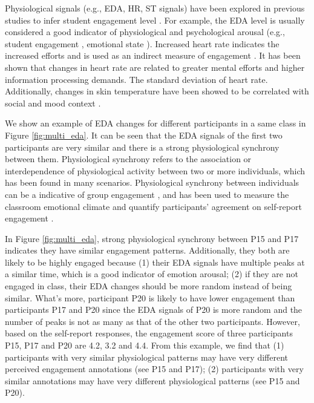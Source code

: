 \documentclass[sigconf]{acmart}
\begin{document}
Physiological signals (e.g., EDA, HR, ST signals) have been explored in previous studies to infer student engagement level \cite{gao2020n,di2018engagement}. For example, the EDA level is usually considered  a good indicator of physiological and psychological arousal (e.g., student engagement \cite{gao2020n}, emotional state \cite{di2018engagement}). Increased heart rate indicates the increased efforts and is used as an indirect measure of engagement \cite{richardson2020engagement}. It has been shown that changes in heart rate are related to greater mental efforts and higher information processing demands. The standard deviation of heart rate. Additionally, changes in skin temperature have been showed to be correlated with social and mood context \cite{ioannou2014thermal}. 

We show an example of EDA changes for different participants in a same class in Figure \ref{fig:multi_eda}. It can be seen that the EDA signals of the first two participants are very similar and there is a strong physiological synchrony  \cite{palumbo2017interpersonal} between them. Physiological synchrony refers to the association or interdependence of physiological activity between two or more individuals, which has been found in many scenarios. Physiological synchrony between individuals can be a indicative of group engagement \cite{palumbo2017interpersonal}, and has been used to measure the classroom emotional climate \cite{gashi2018using} and quantify participants' agreement on self-report engagement \cite{gashi2019using}. 

In  Figure \ref{fig:multi_eda}, strong physiological synchrony between P15 and P17 indicates they have similar engagement patterns. Additionally, they both are likely to be highly engaged because (1) their EDA signals have multiple peaks at a similar time, which is a good indicator of emotion arousal; (2) if they are not engaged in class, their EDA changes should be more random instead of being similar. What's more, participant P20 is likely to have lower engagement than participants P17 and P20 since the EDA signals of P20 is more random and the number of peaks is not as many as that of the other two participants. However, based on the self-report responses, the engagement score of three participants P15, P17 and P20 are 4.2, 3.2 and 4.4. From this example, we find that (1) participants with very similar physiological patterns may have very different perceived engagement annotations (see P15 and P17); (2) participants with very similar annotations may have very different physiological patterns (see P15 and P20).
\end{document}
